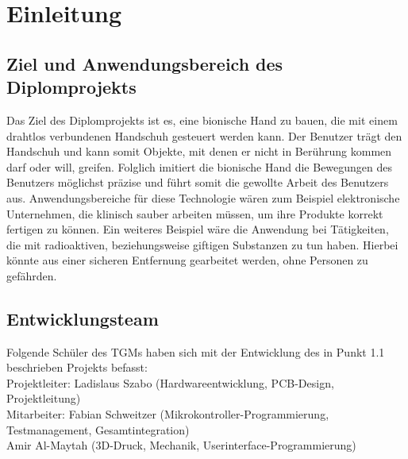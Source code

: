 \documentclass[11pt]{article}
\begin{document}

\tableofcontents


\pagebreak

\section{Einleitung}
\subsection{Ziel und Anwendungsbereich des Diplomprojekts}
Das Ziel des Diplomprojekts ist es, eine bionische Hand zu bauen, die mit einem drahtlos verbundenen Handschuh 
gesteuert werden kann. Der Benutzer trägt den Handschuh und kann somit Objekte, mit denen er nicht in Berührung 
kommen darf oder will, greifen. Folglich imitiert die bionische Hand die Bewegungen des Benutzers möglichst präzise 
und führt somit die gewollte Arbeit des Benutzers aus. Anwendungsbereiche für diese Technologie wären zum Beispiel 
elektronische Unternehmen, die klinisch sauber arbeiten müssen, um ihre Produkte korrekt fertigen zu können. Ein 
weiteres Beispiel wäre die Anwendung bei Tätigkeiten, die mit radioaktiven, beziehungsweise giftigen Substanzen zu 
tun haben. Hierbei könnte aus einer sicheren Entfernung gearbeitet werden, ohne Personen zu gefährden.

\subsection{Entwicklungsteam}
Folgende Schüler des TGMs haben sich mit der Entwicklung des in Punkt 1.1 beschrieben Projekts befasst: \hfill \break
\\
Projektleiter:    Ladislaus Szabo (Hardwareentwicklung, PCB-Design, Projektleitung)\\
Mitarbeiter: Fabian Schweitzer (Mikrokontroller-Programmierung, Testmanagement, Gesamtintegration)\\
Amir Al-Maytah (3D-Druck, Mechanik, Userinterface-Programmierung)
\end{document}
